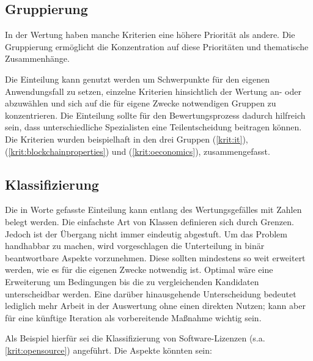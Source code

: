 
\subsection{Gruppierung}

In der Wertung haben manche Kriterien eine höhere Priorität als andere.
Die Gruppierung ermöglicht die Konzentration auf diese Prioritäten und thematische Zusammenhänge.

Die Einteilung kann genutzt werden um Schwerpunkte für den eigenen Anwendungsfall zu setzen,
einzelne Kriterien hinsichtlich der Wertung an- oder abzuwählen und sich auf die für eigene Zwecke notwendigen Gruppen zu konzentrieren.
Die Einteilung sollte für den Bewertungsprozess \zB{} dadurch hilfreich sein, dass unterschiedliche Spezialisten eine Teilentscheidung beitragen können.
Die Kriterien wurden beispielhaft in den drei Gruppen  (\ref{krit:it}),  (\ref{krit:blockchainproperties}) und  (\ref{krit:oeconomics}), zusammengefasst.

\subsection{Klassifizierung}\label{classification}

Die in Worte gefasste Einteilung kann entlang des Wertungsgefälles mit Zahlen belegt werden.
Die einfachste Art von Klassen definieren sich durch Grenzen.
Jedoch ist der Übergang nicht immer eindeutig abgestuft.
Um das Problem handhabbar zu machen, wird vorgeschlagen die Unterteilung in binär beantwortbare Aspekte vorzunehmen.
Diese sollten mindestens so weit erweitert werden, wie es für die eigenen Zwecke notwendig ist.
Optimal wäre eine Erweiterung um Bedingungen bis die zu vergleichenden Kandidaten unterscheidbar werden.
Eine darüber hinausgehende Unterscheidung bedeutet lediglich mehr Arbeit in der Auswertung ohne einen direkten Nutzen; kann aber für eine künftige Iteration als vorbereitende Maßnahme wichtig sein.

Als Beispiel hierfür sei die Klassifizierung von Software-Lizenzen (s.a. \ref{krit:opensource}) angeführt.
Die Aspekte könnten sein:


